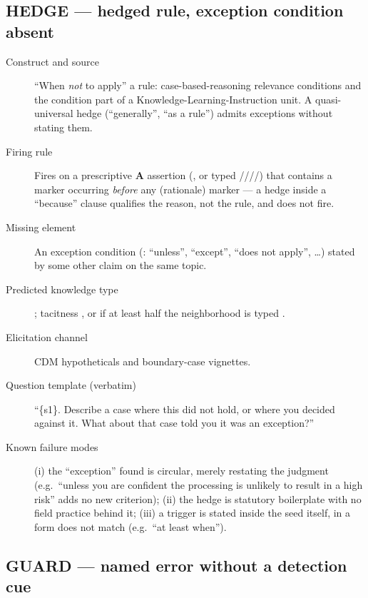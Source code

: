 \subsection{HEDGE --- hedged rule, exception condition absent}

\begin{description}
  \item[Construct and source] \enquote{When \emph{not} to apply} a rule: case-based-reasoning
    relevance conditions and the condition part of a Knowledge-Learning-Instruction unit. A
    quasi-universal hedge (\enquote{generally}, \enquote{as a rule}) admits exceptions without
    stating them.
  \item[Firing rule] Fires on a prescriptive \textbf{A} assertion (, or typed
    /\allowbreak{}/\allowbreak{}/\allowbreak{}/\allowbreak{}) that contains
    a  marker occurring \emph{before} any  (rationale) marker --- a hedge
    inside a \enquote{because} clause qualifies the reason, not the rule, and does not fire.
  \item[Missing element] An exception condition (: \enquote{unless}, \enquote{except},
    \enquote{does not apply}, \ldots) stated by some other claim on the same topic.
  \item[Predicted knowledge type] ; tacitness , or
     if at least half the neighborhood is typed .
  \item[Elicitation channel] CDM hypotheticals and boundary-case vignettes.
  \item[Question template (verbatim)] \enquote{\textquotedbl\{s1\}\textquotedbl. Describe a case
    where this did not hold, or where you decided against it. What about that case told you it was
    an exception?}
  \item[Known failure modes] (i) the \enquote{exception} found is circular, merely restating the
    judgment (e.g.\ \enquote{unless you are confident the processing is unlikely to result in a
    high risk} adds no new criterion); (ii) the hedge is statutory boilerplate with no field
    practice behind it; (iii) a trigger is stated inside the seed itself, in a form  does
    not match (e.g.\ \enquote{at least when}).
\end{description}

\subsection{GUARD --- named error without a detection cue}


